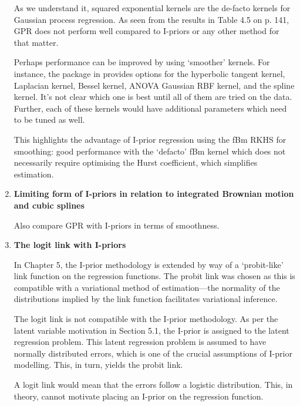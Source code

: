 \documentclass[11pt,showframe]{report}
\begin{document}
\begin{enumerate}
  As we understand it, squared exponential kernels are the de-facto kernels for Gaussian process regression.
  As seen from the results in Table 4.5 on p. 141, GPR does not perform well compared to I-priors or any other method for that matter.
  
  Perhaps performance can be improved by using `smoother' kernels.
  For instance, the  package in  provides options for the hyperbolic tangent kernel, Laplacian kernel, Bessel kernel, ANOVA Gaussian RBF kernel, and the spline kernel.
  It's not clear which one is best until all of them are tried on the data.
  Further, each of these kernels would have additional parameters which need to be tuned as well.
  
  This highlights the advantage of I-prior regression using the fBm RKHS for smoothing: good performance with the `defacto' fBm kernel which does not necessarily require optimising the Hurst coefficient, which simplifies estimation.
  
  
  \item \textbf{Limiting form of I-priors in relation to integrated Brownian motion and cubic splines}

  Also compare GPR with I-priors in terms of smoothness.

  \item \textbf{The logit link with I-priors}
  
  In Chapter 5, the I-prior methodology is extended by way of a `probit-like' link function on the regression functions. 
  The probit link was chosen as this is compatible with a variational method of estimation---the normality of the distributions implied by the link function facilitates variational inference.
  
  The logit link is not compatible with the I-prior methodology.
  As per the latent variable motivation in Section 5.1, the I-prior is assigned to the latent regression problem.
  This latent regression problem is assumed to have normally distributed errors, which is one of the crucial assumptions of I-prior modelling.
  This, in turn, yields the probit link.
  
  A logit link would mean that the errors follow a logistic distribution.
  This, in theory, cannot motivate placing an I-prior on the regression function.
  


\end{enumerate}
\end{document}
